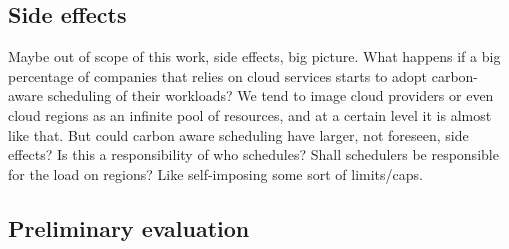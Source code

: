\subsection{Side effects}

Maybe out of scope of this work, side effects, big picture.
What happens if a big percentage of companies that relies on cloud services starts to adopt carbon-aware scheduling of their workloads?
We tend to image cloud providers or even cloud regions as an infinite pool of resources, and at a certain level it is almost like that. But could carbon aware scheduling have larger, not foreseen, side effects?
Is this a responsibility of who schedules? Shall schedulers be responsible for the load on regions? Like self-imposing some sort of limits/caps.

\subsection{Preliminary evaluation}

\newpage
